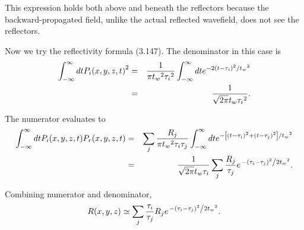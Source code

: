 This expression holds both above and beneath the reflectors because the backward-propagated field, unlike the actual reflected wavefield, does not see the reflectors.

Now we try the reflectivity formula (3.147). The denominator in this case is
\begin{eqnarray} \int _{-\infty }^{\infty }d\text{\textit{$t$}}\text{\textit{$ $}}\text{\textit{$P_i$}}\text{\textit{$(x,y,z,t)$}}^2\text{\textit{$
$}} & = & \frac{1}{\pi  \text{\textit{$t_w$}}{}^2\tau _{\text{\textit{$i$}}}{}^2}\int _{-\infty }^{\infty }d\text{\textit{$t$}}\text{\textit{$ $}}e^{-2\left(\text{\textit{$t$}}-\tau
_i\right){}^2/\text{\textit{$t_w$}}{}^2}\nonumber\\
& = & \frac{1}{\sqrt{2\pi } \text{\textit{$t_w$}}\tau _{\text{\textit{$i$}}}{}^2}.\end{eqnarray}

The numerator evaluates to
\begin{eqnarray}
\int _{-\infty }^{\infty }d\text{\textit{$t$}} \text{\textit{$P_i$}}\text{\textit{$(x,y,z,t)$}}\text{\textit{$ $}}\text{\textit{$P_r$}}\text{\textit{$(x,y,z,t)$}}\text{\textit{$
$}} & = & \sum _{\text{\textit{$j$}}} \frac{\text{\textit{$R$}}_{\text{\textit{$j$}}}}{\pi  \text{\textit{$t_w$}}{}^2\tau _{\text{\textit{$i$}}}\tau _{\text{\textit{$j$}}}}\int
_{-\infty }^{\infty }d\text{\textit{$t$}} e^{-\left[\left(\text{\textit{$t$}}-\text{\textit{$\tau _i$}}\right){}^2+\left(\text{\textit{$t$}}-\tau
_{\text{\textit{$j$}}}\right){}^2\right]/\text{\textit{$t_w$}}{}^2}
\nonumber\\
 & = & \frac{1}{\sqrt{2\pi } \text{\textit{$t_w$}}\tau _{\text{\textit{$i$}}}}\sum _{\text{\textit{$j$}}} \frac{\text{\textit{$R$}}_{\text{\textit{$j$}}}}{\tau
_{\text{\textit{$j$}}}} e^{\left.-\left(\tau _{\text{\textit{$i$}}}-\tau _{\text{\textit{$j$}}}\right){}^2\right/2 \text{\textit{$t_w{}^2$}}}.
\end{eqnarray}

Combining numerator and denominator,
\begin{equation}\text{\textit{$R(x,y,z)$}}\simeq \sum _{\text{\textit{$j$}}} \frac{\tau _{\text{\textit{$i$}}}}{\tau _{\text{\textit{$j$}}}}\text{\textit{$R$}}_{\text{\textit{$j$}}}
e^{\left.-\left(\tau _{\text{\textit{$i$}}}-\tau _{\text{\textit{$j$}}}\right){}^2\right/2 \text{\textit{$t_w{}^2$}}}.\end{equation}

